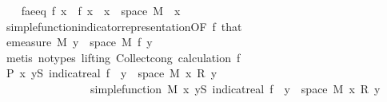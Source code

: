 \begin{isabellebody}
\ \ \isamarkupfalse%
\ f{\isacharunderscore}{\kern0pt}ae{\isacharunderscore}{\kern0pt}eq{\isacharcolon}{\kern0pt}\ {\isachardoublequoteopen}f\ x\ {\isacharequal}{\kern0pt}\ {\isacharquery}{\kern0pt}f\ x{\isachardoublequoteclose}\ \ {\isachardoublequoteopen}x\ {\isasymin}\ space\ M{\isachardoublequoteclose}\ \ x\ \isamarkupfalse%
\ simple{\isacharunderscore}{\kern0pt}function{\isacharunderscore}{\kern0pt}indicator{\isacharunderscore}{\kern0pt}representation{\isacharbrackleft}{\kern0pt}OF\ f{\isacharparenleft}{\kern0pt}{}{\isacharparenright}{\kern0pt}\ that{\isacharbrackright}{\kern0pt}\ \isacommand{{\isachardot}{\kern0pt}}\isamarkupfalse%
\isanewline
\ \ \isamarkupfalse%
\ \isamarkupfalse%
\ {\isachardoublequoteopen}emeasure\ M\ {\isacharbraceleft}{\kern0pt}y\ {\isasymin}\ space\ M{\isachardot}{\kern0pt}\ {\isacharquery}{\kern0pt}f\ y\ {\isasymnoteq}\ {}{\isacharbraceright}{\kern0pt}\ {\isasymnoteq}\ {\isasyminfinity}{\isachardoublequoteclose}\ \isamarkupfalse%
\ {\isacharparenleft}{\kern0pt}metis\ {\isacharparenleft}{\kern0pt}no{\isacharunderscore}{\kern0pt}types{\isacharcomma}{\kern0pt}\ lifting{\isacharparenright}{\kern0pt}\ Collect{\isacharunderscore}{\kern0pt}cong\ calculation\ f{\isacharparenleft}{\kern0pt}{}{\isacharparenright}{\kern0pt}{\isacharparenright}{\kern0pt}\isanewline
\ \ \isamarkupfalse%
\ \isamarkupfalse%
\ {\isachardoublequoteopen}P\ {\isacharparenleft}{\kern0pt}{\isasymlambda}x{\isachardot}{\kern0pt}\ {\isasymSum}y{\isasymin}S{\isachardot}{\kern0pt}\ indicat{\isacharunderscore}{\kern0pt}real\ {\isacharparenleft}{\kern0pt}f\ {\isacharminus}{\kern0pt}{\isacharbackquote}{\kern0pt}\ {\isacharbraceleft}{\kern0pt}y{\isacharbraceright}{\kern0pt}\ {\isasyminter}\ space\ M{\isacharparenright}{\kern0pt}\ x\ {\isacharasterisk}{\kern0pt}\isactrlsub R\ y{\isacharparenright}{\kern0pt}{\isachardoublequoteclose}\isanewline
\ \ \ \ \ \ \ \ \ \ \ \ \ \ \ \ {\isachardoublequoteopen}simple{\isacharunderscore}{\kern0pt}function\ M\ {\isacharparenleft}{\kern0pt}{\isasymlambda}x{\isachardot}{\kern0pt}\ {\isasymSum}y{\isasymin}S{\isachardot}{\kern0pt}\ indicat{\isacharunderscore}{\kern0pt}real\ {\isacharparenleft}{\kern0pt}f\ {\isacharminus}{\kern0pt}{\isacharbackquote}{\kern0pt}\ {\isacharbraceleft}{\kern0pt}y{\isacharbraceright}{\kern0pt}\ {\isasyminter}\ space\ M{\isacharparenright}{\kern0pt}\ x\ {\isacharasterisk}{\kern0pt}\isactrlsub R\ y{\isacharparenright}{\kern0pt}{\isachardoublequoteclose}\isanewline

\end{isabellebody}
